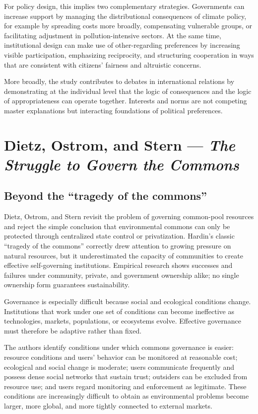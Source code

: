 For policy design, this implies two complementary strategies. Governments can increase support by managing the distributional consequences of climate policy, for example by spreading costs more broadly, compensating vulnerable groups, or facilitating adjustment in pollution-intensive sectors. At the same time, institutional design can make use of other-regarding preferences by increasing visible participation, emphasizing reciprocity, and structuring cooperation in ways that are consistent with citizens' fairness and altruistic concerns.

More broadly, the study contributes to debates in international relations by demonstrating at the individual level that the logic of consequences and the logic of appropriateness can operate together. Interests and norms are not competing master explanations but interacting foundations of political preferences.


\clearpage
\section{Dietz, Ostrom, and Stern --- \textit{The Struggle to Govern the Commons}}

\subsection{Beyond the ``tragedy of the commons''}

Dietz, Ostrom, and Stern revisit the problem of governing common-pool resources and reject the simple conclusion that environmental commons can only be protected through centralized state control or privatization. Hardin's classic ``tragedy of the commons'' correctly drew attention to growing pressure on natural resources, but it underestimated the capacity of communities to create effective self-governing institutions. Empirical research shows successes and failures under community, private, and government ownership alike; no single ownership form guarantees sustainability.

Governance is especially difficult because social and ecological conditions change. Institutions that work under one set of conditions can become ineffective as technologies, markets, populations, or ecosystems evolve. Effective governance must therefore be adaptive rather than fixed.

The authors identify conditions under which commons governance is easier: resource conditions and users' behavior can be monitored at reasonable cost; ecological and social change is moderate; users communicate frequently and possess dense social networks that sustain trust; outsiders can be excluded from resource use; and users regard monitoring and enforcement as legitimate. These conditions are increasingly difficult to obtain as environmental problems become larger, more global, and more tightly connected to external markets.

